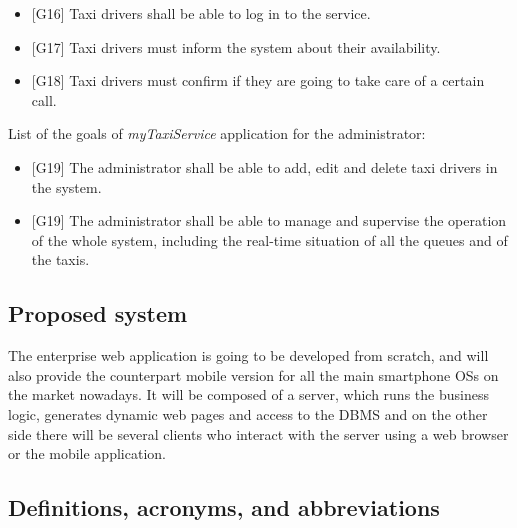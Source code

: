 \documentclass[a4paper,11pt]{report} %
\newcommand{\mts}{\mbox{\normalfont\itshape myTaxiService}}
\begin{document}
		\begin{itemize}
			\item {[}G16{]} Taxi drivers shall be able to log in to the service.
			\item {[}G17{]} Taxi drivers must inform the system about their availability.
			\item {[}G18{]} Taxi drivers must confirm if they are going to take care of a certain call.
		\end{itemize}
		List of the goals of \mts{} application for the administrator:
		\begin{itemize}
			\item {[}G19{]} The administrator shall be able to add, edit and delete taxi drivers in the system.
			\item {[}G19{]} The administrator shall be able to manage and supervise the operation of the whole system, including the real-time situation of all the queues and of the taxis.
		\end{itemize}
		
		
		
	\subsection{Proposed system}
	The enterprise web application is going to be developed from scratch, and will also provide the counterpart mobile version for all the main smartphone OSs on the market nowadays. It will be composed of a server, which runs the business logic, generates dynamic web pages and access to the DBMS and on the other side there will be several clients who interact with the server using a web browser or the mobile application.
	
	\subsection{Definitions, acronyms, and abbreviations}
	
\end{document}
